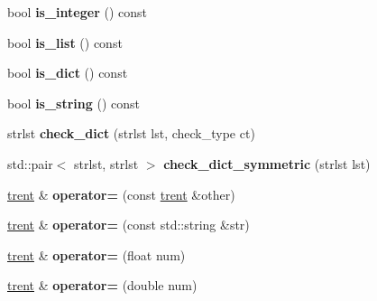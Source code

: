 \begin{DoxyCompactItemize}
\item 
bool {\bfseries is\+\_\+integer} () const \hypertarget{classgxx_1_1trent_a48d7d6f746d09e5ecfda80580d038af0}{}\label{classgxx_1_1trent_a48d7d6f746d09e5ecfda80580d038af0}

\item 
bool {\bfseries is\+\_\+list} () const \hypertarget{classgxx_1_1trent_af9bd04a617e341888688fcfae768c1f4}{}\label{classgxx_1_1trent_af9bd04a617e341888688fcfae768c1f4}

\item 
bool {\bfseries is\+\_\+dict} () const \hypertarget{classgxx_1_1trent_a868fe32ef45732a3e355606dae8f7f7c}{}\label{classgxx_1_1trent_a868fe32ef45732a3e355606dae8f7f7c}

\item 
bool {\bfseries is\+\_\+string} () const \hypertarget{classgxx_1_1trent_a5385df291a2947a14ef34b48347d2155}{}\label{classgxx_1_1trent_a5385df291a2947a14ef34b48347d2155}

\item 
strlst {\bfseries check\+\_\+dict} (strlst lst, check\+\_\+type ct)\hypertarget{classgxx_1_1trent_a68e187c963e64b8c1f343fa95d80af46}{}\label{classgxx_1_1trent_a68e187c963e64b8c1f343fa95d80af46}

\item 
std\+::pair$<$ strlst, strlst $>$ {\bfseries check\+\_\+dict\+\_\+symmetric} (strlst lst)\hypertarget{classgxx_1_1trent_ad583e0c2230bb9fdf352fdc0153f718a}{}\label{classgxx_1_1trent_ad583e0c2230bb9fdf352fdc0153f718a}

\item 
\hyperlink{classgxx_1_1trent}{trent} \& {\bfseries operator=} (const \hyperlink{classgxx_1_1trent}{trent} \&other)\hypertarget{classgxx_1_1trent_a1d9f1e7ac329694331426445b70983d5}{}\label{classgxx_1_1trent_a1d9f1e7ac329694331426445b70983d5}

\item 
\hyperlink{classgxx_1_1trent}{trent} \& {\bfseries operator=} (const std\+::string \&str)\hypertarget{classgxx_1_1trent_a8c72f4f768a2eba1440d9bc8beb4a59b}{}\label{classgxx_1_1trent_a8c72f4f768a2eba1440d9bc8beb4a59b}

\item 
\hyperlink{classgxx_1_1trent}{trent} \& {\bfseries operator=} (float num)\hypertarget{classgxx_1_1trent_a3f8b933297b8a3e8b499816fb109809b}{}\label{classgxx_1_1trent_a3f8b933297b8a3e8b499816fb109809b}

\item 
\hyperlink{classgxx_1_1trent}{trent} \& {\bfseries operator=} (double num)\hypertarget{classgxx_1_1trent_a08b518e3e29f3303058267c730fee0cd}{}\label{classgxx_1_1trent_a08b518e3e29f3303058267c730fee0cd}


\end{DoxyCompactItemize}

